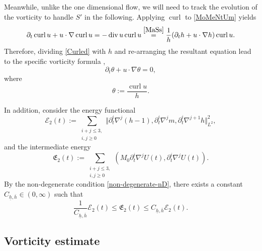\documentclass[reqno,11pt]{amsart}
\newcommand{\norm}[2]{\Vert #1 \Vert_{#2}}
\DeclareMathOperator{\Div}{div}
\DeclareMathOperator{\curl}{curl}
\theoremstyle{plain}
\theoremstyle{definition}
\numberwithin{equation}{section}
\begin{document}
\smallskip 

Meanwhile, unlike the one dimensional flow, we will need to track the evolution of the vorticity to handle $ S' $ in the following. Applying $\curl$ to \eqref{MoMeNtUm} yields
\begin{equation}
    \label{Curled}
    \partial_t \curl u+u\cdot \nabla \curl u = - \Div u \curl u \overset{\eqref{MaSs}}{=} \frac{1}{h}(\partial_t h + u \cdot \nabla h) \curl u.
\end{equation}
Therefore, dividing \eqref{Curled} with $ h $ and re-arranging the resultant equation lead to the specific vorticity formula \cite{BreschDesjardinsMetivier,ShkollerVicol,ChenCialdeaShkollerVicol},
\begin{equation}
    \label{CurledTransport}
    \partial_t \theta +u\cdot \nabla \theta =0,
\end{equation}
where
\begin{equation}
    \label{ThetaVariable}
    \theta:=\frac{\curl u}{h}.
\end{equation}

\smallskip 
In addition, 
consider the energy functional
\begin{equation}
    \label{Energy-2d}
    \mathcal{E}_2(t):=\sum_{\substack{i+ j\leq 3, \\ i,j \geq 0}} \norm{\partial_t^i \nabla^{j}(h-1),\partial_t^i\nabla^j m,\partial_t^i\nabla^{j+1} h}{L^2}^2,
\end{equation}
and the intermediate energy 
\begin{equation}
    \label{intrmd-energy-2d}
    \mathfrak{E}_2(t):=\sum_{\substack{i+ j \leq 3, \\ i, j \geq 0}} (M_0\partial_t^i\nabla^j  U(t),\partial_t^i\nabla^j U(t)).
\end{equation}
By the non-degenerate condition \eqref{non-degenerate-nD}, there exists a constant $C_{\underline{h},\overline{h}}\in (0,\infty)$ such that
       \begin{equation}
       \label{Energy-equiv-2d-cauchy}
            \frac{1}{C_{\underline{h},\overline{h}}}\mathcal{E}_2(t)\leq \mathfrak{E}_2(t)\leq C_{\underline{h},\overline{h}}\mathcal{E}_2(t).
        \end{equation}

\subsection{Vorticity estimate}
\label{subsec:2d-vorticity}
\end{document}
